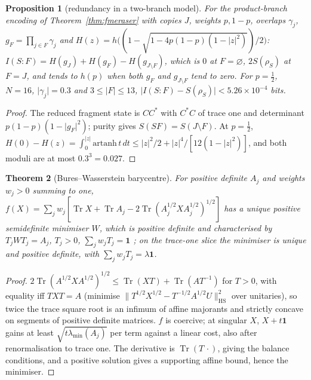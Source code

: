 \documentclass[aps,pra,onecolumn,superscriptaddress,nofootinbib,10pt]{revtex4-2}
\newtheorem{theorem}{Theorem}
\newtheorem{proposition}[theorem]{Proposition}
\theoremstyle{definition}
\theoremstyle{remark}
\newcommand{\tr}{\operatorname{Tr}}
\begin{document}
\begin{proposition}[redundancy in a two-branch model]\label{prop:fmredundancy}
For the product-branch encoding of Theorem~\ref{thm:fmeraser} with copies $J$, weights $p,1-p$, overlaps $\gamma_j$, $g_F=\prod_{j\in F}\gamma_j$ and
$H(z)=h\bigl((1-\sqrt{1-4p(1-p)(1-\lvert z\rvert^2)})/2\bigr)$: $I(S{:}F)=H(g_J)+H(g_F)-H(g_{J\setminus F})$, which is $0$ at $F=\varnothing$, $2S(\rho_S)$ at $F=J$, and tends to $h(p)$ when both
$g_F$ and $g_{J\setminus F}$ tend to zero.  For $p=\tfrac12$, $N=16$, $\lvert\gamma_j\rvert=0.3$ and $3\le\lvert F\rvert\le13$, $\lvert I(S{:}F)-S(\rho_S)\rvert<5.26\times10^{-4}$ bits.
\end{proposition}
\begin{proof}
The reduced fragment state is $CC^*$ with $C^*C$ of trace one and determinant $p(1-p)(1-\lvert g_F\rvert^2)$; purity gives $S(SF)=S(J\setminus F)$.  At
$p=\tfrac12$, $H(0)-H(z)=\int_0^{\lvert z\rvert}\mathrm{artanh}\,t\,dt\le\lvert z\rvert^2/2+\lvert z\rvert^4/[12(1-\lvert z\rvert^2)]$, and both moduli are at most $0.3^3=0.027$.
\end{proof}

\begin{theorem}[Bures--Wasserstein barycentre]\label{thm:fmbary}
For positive definite $A_j$ and weights $w_j>0$ summing to one, $f(X)=\sum_jw_j[\tr X+\tr A_j-2\tr(A_j^{1/2}XA_j^{1/2})^{1/2}]$ has a unique positive
semidefinite minimiser $W$, which is positive definite and characterised by $T_jWT_j=A_j$, $T_j>0$, $\sum_jw_jT_j=\mathbf1$
\cite[Thm.~8, Eq.~(57)]{n2-bjl}; on the trace-one slice the minimiser is unique and positive definite, with
$\sum_jw_jT_j=\lambda\mathbf1$.
\end{theorem}
\begin{proof}
$2\tr(A^{1/2}XA^{1/2})^{1/2}\le\tr(XT)+\tr(AT^{-1})$ for $T>0$, with equality iff $TXT=A$ (minimise $\lVert T^{1/2}X^{1/2}-T^{-1/2}A^{1/2}U\rVert_{\mathrm{HS}}^2$ over unitaries), so twice the
trace square root is an infimum of affine majorants and strictly concave on segments of positive definite
matrices.  $f$ is coercive; at singular $X$, $X+t\mathbf1$ gains at least $\sqrt{t\lambda_{\min}(A_j)}$ per term against a linear cost, also after
renormalisation to trace one.  The derivative is $\tr(T\,\cdot)$, giving the balance conditions, and a positive solution
gives a supporting affine bound, hence the minimiser.
\end{proof}
\end{document}
